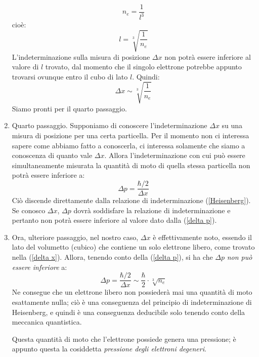 \begin{enumerate}
\begin{equation}
n_{e}=\frac{1}{l^{3}}
\end{equation}
cioè:
\begin{equation}\label{lato}
l=\sqrt[3]{\frac{1}{n_{e}}}
\end{equation}
L'indeterminazione sulla misura di posizione $\Delta x$ non potr\`{a} essere inferiore al valore di $l$ trovato, dal momento che il singolo elettrone potrebbe appunto trovarsi ovunque entro il cubo di lato $l$. Quindi:
\begin{equation}\label{delta x}
\Delta x \sim \sqrt[3]{\frac{1}{n_{e}}}
\end{equation}
Siamo pronti per il quarto passaggio.
\item
Quarto passaggio.
Supponiamo di conoscere l'indeterminazione $\Delta x$ su una misura di posizione per una certa particella. Per il momento non ci interessa sapere come abbiamo fatto a conoscerla, ci interessa solamente che siamo a conoscenza di quanto vale $\Delta x$. Allora l'indeterminazione con cui può essere  simultaneamente misurata la quantit\`{a} di moto di quella stessa particella non potr\`{a} essere inferiore a:
\begin{equation}\label{delta p}
\Delta p = \frac{\hbar / 2}{\Delta x}
\end{equation}
Ciò discende direttamente dalla relazione di indeterminazione (\ref{Heisenberg}). Se conosco $\Delta x$, $\Delta p$ dovr\`{a} soddisfare la relazione di indeterminazione e pertanto non potr\`{a} essere inferiore al valore dato dalla (\ref{delta p}).
\item
Ora, ulteriore passaggio, nel nostro caso, $\Delta x$ è effettivamente noto, essendo il lato del volumetto (cubico) che contiene un solo elettrone libero, come trovato nella (\ref{delta x}). Allora, tenendo conto della (\ref{delta p}), si ha che $\Delta p$ \emph{non può essere inferiore} a:
\begin{equation}\label{igloo}
\Delta p = \frac{\hbar /2}{\Delta x} \sim \frac{\hbar}{2} \cdot \sqrt[3]{n_{e}}
\end{equation}
Ne consegue che un elettrone libero non possieder\`{a} mai una quantit\`{a} di moto esattamente nulla; ciò è una conseguenza del principio di indeterminazione di Heisenberg, e quindi è una conseguenza deducibile solo tenendo conto della meccanica quantistica. 
\par
Questa quantit\`{a} di moto che l'elettrone possiede genera una pressione; è appunto questa la cosiddetta \emph{pressione degli elettroni degeneri}.

\end{enumerate}
